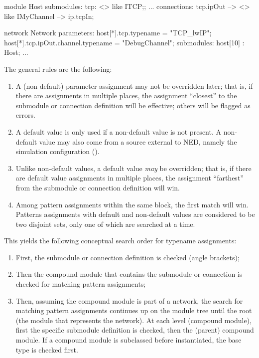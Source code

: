 {\begin{ned}
module Host {
    submodules:
        tcp: <> like ITCP;;
        ...
    connections:
        tcp.ipOut --> <> like IMyChannel --> ip.tcpIn;
}

network Network {
    parameters:
        host[*].tcp.typename = "TCP_lwIP";
        host[*].tcp.ipOut.channel.typename = "DebugChannel";
    submodules:
        host[10] : Host;
        ...
}
\end{ned}

The general rules are the following:

\begin{enumerate}
  \item A (non-default) parameter assignment may not be overridden later;
    that is, if there are assignments in multiple places, the assignment
    ``closest'' to the submodule or connection definition will be effective;
    others will be flagged as errors.
  \item A default value is only used if a non-default value is not present.
    A non-default value may also come from a source external to NED, namely
    the simulation configuration ().
  \item Unlike non-default values, a default value \textit{may} be overridden;
    that is, if there are default value assignments in multiple places,
    the assignment ``farthest'' from the submodule or connection definition will win.
  \item Among pattern assignments within the same 
    block, the first match will win. Patterns assignments with default and
    non-default values are considered to be two disjoint sets, only one of
    which are searched at a time.
\end{enumerate}

This yields the following conceptual search order for typename assignments:

\begin{enumerate}
   \item First, the submodule or connection definition is checked (angle brackets);
   \item Then the compound module that contains the submodule or connection is
     checked for matching pattern assignments;
   \item Then, assuming the compound module is part of a network, the search
     for matching pattern assignments continues up on the module tree until the root
     (the module that represents the network). At each level (compound module),
     first the specific submodule definition is checked, then the (parent) compound module.
     If a compound module is subclassed before instantiated, the base type is checked
     first.
\end{enumerate}

}
